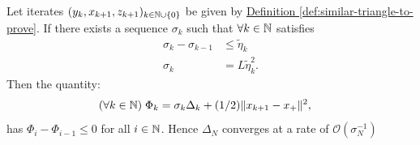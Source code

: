 \documentclass[12pt]{article}
\begin{document}
    \begin{proposition}
        Let iterates $(y_k, x_{k + 1}, z_{k + 1})_{k \in \mathbb N\cup \{0\}}$ be given by 
        \hyperref[def:similar-triangle-to-prove]
        {Definition \ref*{def:similar-triangle-to-prove}}. 
        If there exists a sequence $\sigma_k$ such that $\forall k \in \mathbb N$ satisfies
        \begin{align*}
            \sigma_k - \sigma_{k - 1}&\le \tilde \eta_k 
            \\
            \sigma_k &= L\tilde \eta_k^2. 
        \end{align*}
        Then the quantity: 
        \begin{align*}
            (\forall k \in \mathbb N)\; 
            \Phi_k &= \sigma_k \Delta_k + (1/2) \Vert x_{k + 1} - x_+\Vert^2, 
        \end{align*}
        has $\Phi_{i} - \Phi_{i - 1} \le 0$ for all $i\in \mathbb N$.
        Hence $\Delta_N$ converges at a rate of $\mathcal O(\sigma_N^{-1})$
    \end{proposition}
\end{document}
